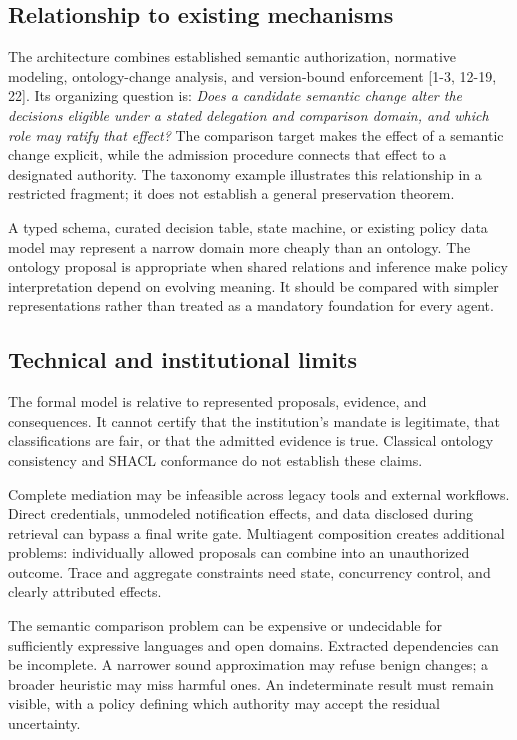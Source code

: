 \documentclass[
  english,
  12pt,
  a4paper,
  preprint,
  numbers,
  nopreprintline]{elsarticle}
\begin{document}
\subsection{Relationship to existing
mechanisms}\label{relationship-to-existing-mechanisms}

The architecture combines established semantic authorization, normative
modeling, ontology-change analysis, and version-bound enforcement
{[}1-3, 12-19, 22{]}. Its organizing question is: \emph{Does a candidate
semantic change alter the decisions eligible under a stated delegation
and comparison domain, and which role may ratify that effect?} The
comparison target makes the effect of a semantic change explicit, while
the admission procedure connects that effect to a designated authority.
The taxonomy example illustrates this relationship in a restricted
fragment; it does not establish a general preservation theorem.

A typed schema, curated decision table, state machine, or existing
policy data model may represent a narrow domain more cheaply than an
ontology. The ontology proposal is appropriate when shared relations and
inference make policy interpretation depend on evolving meaning. It
should be compared with simpler representations rather than treated as a
mandatory foundation for every agent.

\subsection{Technical and institutional
limits}\label{technical-and-institutional-limits}

The formal model is relative to represented proposals, evidence, and
consequences. It cannot certify that the institution's mandate is
legitimate, that classifications are fair, or that the admitted evidence
is true. Classical ontology consistency and SHACL conformance do not
establish these claims.

Complete mediation may be infeasible across legacy tools and external
workflows. Direct credentials, unmodeled notification effects, and data
disclosed during retrieval can bypass a final write gate. Multiagent
composition creates additional problems: individually allowed proposals
can combine into an unauthorized outcome. Trace and aggregate
constraints need state, concurrency control, and clearly attributed
effects.

The semantic comparison problem can be expensive or undecidable for
sufficiently expressive languages and open domains. Extracted
dependencies can be incomplete. A narrower sound approximation may
refuse benign changes; a broader heuristic may miss harmful ones. An
indeterminate result must remain visible, with a policy defining which
authority may accept the residual uncertainty.
\end{document}
